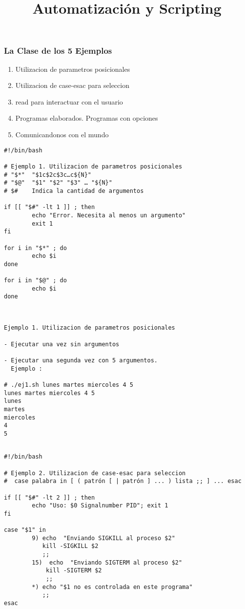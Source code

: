 \documentclass{beamer}
\title{Automatización y Scripting}
\begin{document}
\begin{frame}
  \titlepage

\end{frame}






\begin{frame}{}
\frametitle{La Clase de los 5 Ejemplos}
\begin{enumerate}
\item Utilizacion de parametros posicionales
\item Utilizacion de case-esac para seleccion
\item read para interactuar con el usuario
\item Programas elaborados. Programas con opciones
\item Comunicandonos con el mundo
\end{enumerate}
\end{frame}{}



\begin{Verbatim}
#!/bin/bash

# Ejemplo 1. Utilizacion de parametros posicionales
# "$*"  "$1c$2c$3c…c${N}"
# "$@"  "$1" "$2" "$3" … "${N}"
# $#    Indica la cantidad de argumentos

if [[ "$#" -lt 1 ]] ; then
        echo "Error. Necesita al menos un argumento"
        exit 1
fi

for i in "$*" ; do
        echo $i
done

for i in "$@" ; do
        echo $i
done
\end{Verbatim}


\begin{Verbatim}


Ejemplo 1. Utilizacion de parametros posicionales

- Ejecutar una vez sin argumentos

- Ejecutar una segunda vez con 5 argumentos.
  Ejemplo : 

# ./ej1.sh lunes martes miercoles 4 5
lunes martes miercoles 4 5
lunes
martes
miercoles
4
5


\end{Verbatim}



\begin{Verbatim}
#!/bin/bash

# Ejemplo 2. Utilizacion de case-esac para seleccion
#  case palabra in [ ( patrón [ | patrón ] ... ) lista ;; ] ... esac

if [[ "$#" -lt 2 ]] ; then
        echo "Uso: $0 Signalnumber PID"; exit 1
fi

case "$1" in
        9) echo  "Enviando SIGKILL al proceso $2"
           kill -SIGKILL $2
           ;;
        15)  echo  "Enviando SIGTERM al proceso $2"
            kill -SIGTERM $2
            ;;
        *) echo "$1 no es controlada en este programa"
           ;;
esac
\end{Verbatim}
\end{document}
